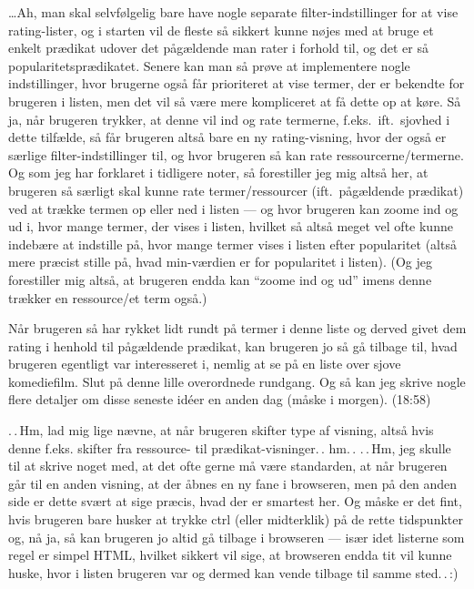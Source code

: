 \documentclass{report}
\begin{document}
\ldots Ah, man skal selvfølgelig bare have nogle separate filter-indstillinger for at vise rating-lister, og i starten vil de fleste så sikkert kunne nøjes med at bruge et enkelt prædikat udover det pågældende man rater i forhold til, og det er så popularitetsprædikatet. Senere kan man så prøve at implementere nogle indstillinger, hvor brugerne også får prioriteret at vise termer, der er bekendte for brugeren i listen, men det vil så være mere kompliceret at få dette op at køre. Så ja, når brugeren trykker, at denne vil ind og rate termerne, f.eks.\ ift.\ sjovhed i dette tilfælde, så får brugeren altså bare en ny rating-visning, hvor der også er særlige filter-indstillinger til, og hvor brugeren så kan rate ressourcerne/termerne. Og som jeg har forklaret i tidligere noter, så forestiller jeg mig altså her, at brugeren så særligt skal kunne rate termer/ressourcer (ift.\ pågældende prædikat) ved at trække termen op eller ned i listen --- og hvor brugeren kan zoome ind og ud i, hvor mange termer, der vises i listen, hvilket så altså meget vel ofte kunne indebære at indstille på, hvor mange termer vises i listen efter popularitet (altså mere præcist stille på, hvad min-værdien er for popularitet i listen). (Og jeg forestiller mig altså, at brugeren endda kan ``zoome ind og ud'' imens denne trækker en ressource/et term også.) 

Når brugeren så har rykket lidt rundt på termer i denne liste og derved givet dem rating i henhold til pågældende prædikat, kan brugeren jo så gå tilbage til, hvad brugeren egentligt var interesseret i, nemlig at se på en liste over sjove komediefilm. Slut på denne lille overordnede rundgang. Og så kan jeg skrive nogle flere detaljer om disse seneste idéer en anden dag (måske i morgen). (18:58) 

.\,.\,Hm, lad mig lige nævne, at når brugeren skifter type af visning, altså hvis denne f.eks. skifter fra ressource- til prædikat-visninger.\,. hm.\,. .\,.\,Hm, jeg skulle til at skrive noget med, at det ofte gerne må være standarden, at når brugeren går til en anden visning, at der åbnes en ny fane i browseren, men på den anden side er dette svært at sige præcis, hvad der er smartest her. Og måske er det fint, hvis brugeren bare husker at trykke ctrl (eller midterklik) på de rette tidspunkter og, nå ja, så kan brugeren jo altid gå tilbage i browseren --- især idet listerne som regel er simpel HTML, hvilket sikkert vil sige, at browseren endda tit vil kunne huske, hvor i listen brugeren var og dermed kan vende tilbage til samme sted.\,.\,:) 
\end{document}

